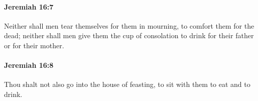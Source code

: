 		\paragraph{Jeremiah 16:7} %
			\label{JEREMIAH-16-7}

			Neither shall men tear themselves for them in mourning, to comfort them for the dead; neither shall men give them the cup of consolation to drink for their father or for their mother.


		\paragraph{Jeremiah 16:8} %
			\label{JEREMIAH-16-8}

			Thou shalt not also go into the house of feasting, to sit with them to eat and to drink.



